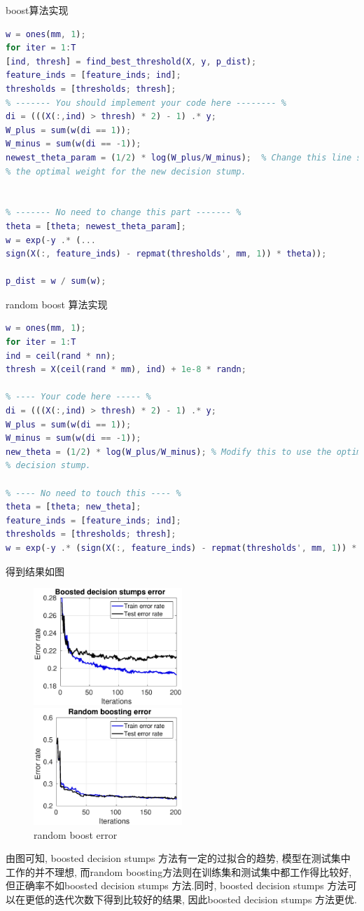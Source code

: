 \documentclass{ctexart}
\begin{document}
boost算法实现

\begin{lstlisting}[language = MATLAB]
w = ones(mm, 1);
for iter = 1:T
[ind, thresh] = find_best_threshold(X, y, p_dist);
feature_inds = [feature_inds; ind];
thresholds = [thresholds; thresh];
% ------- You should implement your code here -------- %
di = (((X(:,ind) > thresh) * 2) - 1) .* y;
W_plus = sum(w(di == 1));
W_minus = sum(w(di == -1));
newest_theta_param = (1/2) * log(W_plus/W_minus);  % Change this line so that newest_theta_param takes
% the optimal weight for the new decision stump.


% ------- No need to change this part ------- %
theta = [theta; newest_theta_param];
w = exp(-y .* (...
sign(X(:, feature_inds) - repmat(thresholds', mm, 1)) * theta));

p_dist = w / sum(w);	
\end{lstlisting}

random boost 算法实现

\begin{lstlisting}[language = MATLAB]
w = ones(mm, 1);
for iter = 1:T
ind = ceil(rand * nn);
thresh = X(ceil(rand * mm), ind) + 1e-8 * randn;

% ---- Your code here ----- %
di = (((X(:,ind) > thresh) * 2) - 1) .* y;
W_plus = sum(w(di == 1));
W_minus = sum(w(di == -1));
new_theta = (1/2) * log(W_plus/W_minus); % Modify this to use the optimal weight for the newest
% decision stump.

% ---- No need to touch this ---- %
theta = [theta; new_theta];
feature_inds = [feature_inds; ind];
thresholds = [thresholds; thresh];
w = exp(-y .* (sign(X(:, feature_inds) - repmat(thresholds', mm, 1)) * theta));
\end{lstlisting}

得到结果如图
\begin{figure}[ht]
	\parbox{0.5\textwidth}{	
		\includegraphics[width = 0.5\textwidth]{boost_nor.eps}
		\caption{boost decision stumps error}
	}
	\parbox{0.5\textwidth}{	
		\includegraphics[width = 0.5\textwidth]{boost.eps}
		\caption{random boost error}
	}
\end{figure}

由图可知, boosted decision stumps 方法有一定的过拟合的趋势, 模型在测试集中工作的并不理想, 而random boosting方法则在训练集和测试集中都工作得比较好, 但正确率不如boosted decision stumps 方法.同时, boosted decision stumps 方法可以在更低的迭代次数下得到比较好的结果, 因此boosted decision stumps 方法更优.
\end{document}
